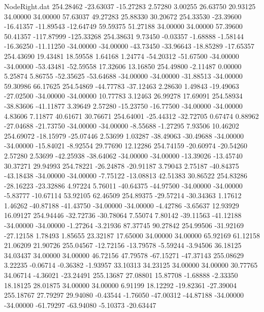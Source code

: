 \begin{filecontents}{NodeRight.dat}
 254.28462  -23.63037  -15.27283     2.57280    3.00255   26.63750   20.93125   34.00000   34.00000   57.63037   49.27283   25.88330   30.20672
 254.33530  -23.39600  -16.41357   -11.89543  -12.64749   59.59375   51.27188   34.00000   34.00000   57.39600   50.41357 -117.87999 -125.33268
 254.38631    9.73450   -0.03357    -1.68888   -1.58144  -16.36250  -11.11250  -34.00000  -34.00000  -43.73450  -33.96643  -18.85289  -17.65357
 254.43690   19.43481   18.59558     1.64168    1.24774  -54.20312  -51.67500  -34.00000  -34.00000  -53.43481  -52.59558   17.32606   13.16850
 254.49800   -2.11487    0.00000     5.25874    5.86755  -52.35625  -53.64688  -34.00000  -34.00000  -31.88513  -34.00000   59.30986   66.17625
 254.54869  -44.77783  -37.12463     2.28630    1.49843  -19.49063  -27.02500  -34.00000  -34.00000   10.77783    3.12463   26.99278   17.69091
 254.58934  -38.83606  -41.11877     3.39649    2.57280  -15.23750  -16.77500  -34.00000  -34.00000    4.83606    7.11877   40.61671   30.76671
 254.64001  -25.44312  -32.72705     0.67474    0.88962  -27.04688  -21.73750  -34.00000  -34.00000   -8.55688   -1.27295    7.93506   10.46202
 254.69072  -18.15979  -25.07446     2.53699    1.03287  -38.49063  -30.49688  -34.00000  -34.00000  -15.84021   -8.92554   29.77690   12.12286
 254.74159  -20.60974  -20.54260     2.57280    2.53699  -42.25938  -38.64062  -34.00000  -34.00000  -13.39026  -13.45740   30.37271   29.94993
 254.78221  -26.24878  -20.91187     3.79043    2.75187  -40.84375  -43.18438  -34.00000  -34.00000   -7.75122  -13.08813   42.51383   30.86522
 254.83286  -28.16223  -23.32886     4.97224    5.76011  -40.64375  -44.97500  -34.00000  -34.00000   -5.83777  -10.67114   53.92105   62.46509
 254.89375  -29.57214  -30.34363     1.17612    1.46262  -40.87188  -41.43750  -34.00000  -34.00000   -4.42786   -3.65637   12.93929   16.09127
 254.94446  -32.72736  -30.78064     7.55074    7.80142  -39.11563  -41.12188  -34.00000  -34.00000   -1.27264   -3.21936   87.37745   90.27842
 254.99506  -31.92169  -27.12158     1.78493    1.85655   23.32187   17.65000   34.00000   34.00000   65.92169   61.12158   21.06209   21.90726
 255.04567  -12.72156  -13.79578    -5.59244   -3.94506   36.18125   34.03437   34.00000   34.00000   46.72156   47.79578  -67.15271  -47.37143
 255.08629    3.22235   -0.06714    -0.36382   -1.93957   33.10313   34.23125   34.00000   34.00000   30.77765   34.06714   -4.36021  -23.24491
 255.13687   27.08801   15.87708    -1.68888   -2.33350   18.18125   28.01875   34.00000   34.00000    6.91199   18.12292  -19.82361  -27.39004
 255.18767   27.79297   29.94080    -0.43544   -1.76050  -47.00312  -44.87188  -34.00000  -34.00000  -61.79297  -63.94080   -5.10373  -20.63447

\end{filecontents}

